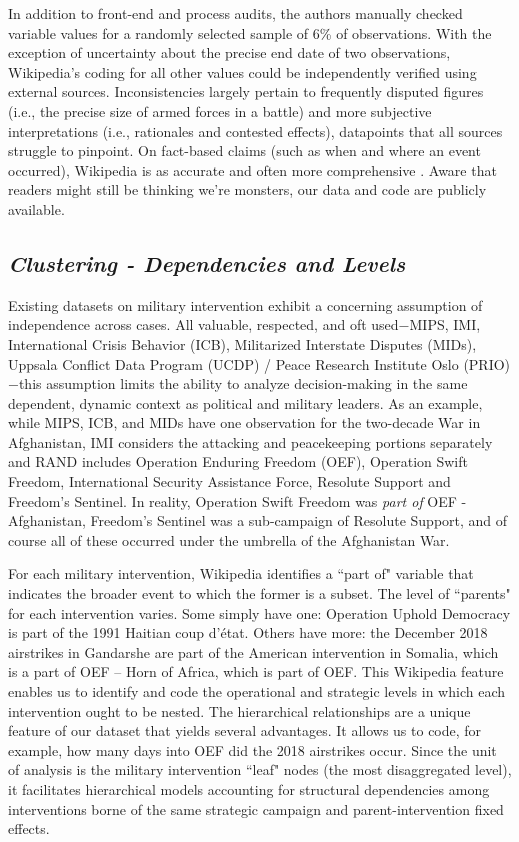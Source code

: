\documentclass[fleqn,12pt]{article}
\begin{document}
In addition to front-end and process audits, the authors manually checked variable values for a randomly selected sample of 6\% of observations. With the exception of uncertainty about the precise end date of two observations, Wikipedia's coding for all other values could be independently verified using external sources. Inconsistencies largely pertain to frequently disputed figures (i.e., the precise size of armed forces in a battle) and more subjective interpretations (i.e., rationales and contested effects), datapoints that all sources struggle to pinpoint. On fact-based claims (such as when and where an event occurred), Wikipedia is as accurate and often more comprehensive \citep{Rector08}. Aware that readers might still be thinking we're monsters, our data and code are publicly available.

\subsection*{\textit{Clustering - Dependencies and Levels}}
Existing datasets on military intervention exhibit a concerning assumption of independence across cases. All valuable, respected, and oft used$-$MIPS, IMI, International Crisis Behavior (ICB), Militarized Interstate Disputes (MIDs), Uppsala Conflict Data Program (UCDP) / Peace Research Institute Oslo (PRIO) $-$this assumption limits the ability to analyze decision-making in the same dependent, dynamic context as political and military leaders. As an example, while MIPS, ICB, and MIDs have one observation for the two-decade War in Afghanistan, IMI considers the attacking and peacekeeping portions separately and RAND includes Operation Enduring Freedom (OEF), Operation Swift Freedom, International Security Assistance Force, Resolute Support and Freedom's Sentinel. In reality, Operation Swift Freedom was \textit{part of} OEF - Afghanistan, Freedom's Sentinel was a sub-campaign of Resolute Support, and of course all of these occurred under the umbrella of the Afghanistan War.

For each military intervention, Wikipedia identifies a ``part of" variable that indicates the broader event to which the former is a subset. The level of ``parents" for each intervention varies. Some simply have one: Operation Uphold Democracy is part of the 1991 Haitian coup d'état. Others have more: the December 2018 airstrikes in Gandarshe are part of the American intervention in Somalia, which is a part of OEF – Horn of Africa, which is part of OEF. This Wikipedia feature enables us to identify and code the operational and strategic levels in which each intervention ought to be nested. The hierarchical relationships are a unique feature of our dataset that yields several advantages. It allows us to code, for example, how many days into OEF did the 2018 airstrikes occur. Since the unit of analysis is the military intervention ``leaf" nodes (the most disaggregated level), it facilitates hierarchical models accounting for structural dependencies among interventions borne of the same strategic campaign and parent-intervention fixed effects.
\end{document}
